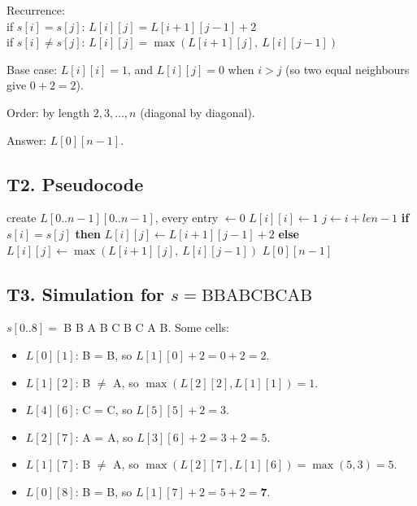\documentclass[11pt]{article}
\begin{document}
\medskip
\noindent Recurrence:\\
if $s[i] = s[j]$: $L[i][j] = L[i+1][j-1] + 2$\\
if $s[i] \neq s[j]$: $L[i][j] = \max(L[i+1][j],\ L[i][j-1])$

\medskip
\noindent Base case: $L[i][i] = 1$, and $L[i][j] = 0$ when $i > j$ (so two equal neighbours give $0 + 2 = 2$).

\medskip
\noindent Order: by length $2, 3, \dots, n$ (diagonal by diagonal).

\medskip
\noindent Answer: $L[0][n-1]$.

\subsection*{T2. Pseudocode}

\begin{algorithm}[H]
\caption{LPS$(s[0..n-1])$}
\begin{algorithmic}[1]
\State create $L[0..n-1][0..n-1]$, every entry $\gets 0$
  \State $L[i][i] \gets 1$
\EndFor
{}
    \State $j \gets i + len - 1$
    \State \textbf{if} $s[i] = s[j]$ \textbf{then}
    \State \hspace{\algorithmicindent}$L[i][j] \gets L[i+1][j-1] + 2$
    \State \textbf{else} $L[i][j] \gets \max(L[i+1][j],\ L[i][j-1])$
  \EndFor
\EndFor
\State \Return $L[0][n-1]$
\end{algorithmic}
\end{algorithm}

\subsection*{T3. Simulation for $s = \text{BBABCBCAB}$}

$s[0..8] =$ B B A B C B C A B. Some cells:
\begin{itemize}[nosep]
\item $L[0][1]$: B = B, so $L[1][0] + 2 = 0 + 2 = 2$.
\item $L[1][2]$: B $\neq$ A, so $\max(L[2][2], L[1][1]) = 1$.
\item $L[4][6]$: C = C, so $L[5][5] + 2 = 3$.
\item $L[2][7]$: A = A, so $L[3][6] + 2 = 3 + 2 = 5$.
\item $L[1][7]$: B $\neq$ A, so $\max(L[2][7], L[1][6]) = \max(5, 3) = 5$.
\item $L[0][8]$: B = B, so $L[1][7] + 2 = 5 + 2 = \mathbf{7}$.
\end{itemize}
\end{document}
